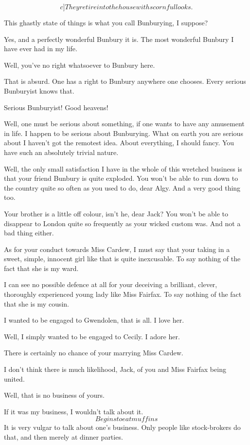 \documentclass{book}
\begin{document}
\[c]They retire into the house with scornful looks.\]

\1  This ghastly state of things is what you call Bunburying, I
suppose?

\2  Yes, and a perfectly wonderful Bunbury it is.  The most
wonderful Bunbury I have ever had in my life.

\1  Well, you've no right whatsoever to Bunbury here.

\2  That is absurd.  One has a right to Bunbury anywhere one
chooses.  Every serious Bunburyist knows that.

\1  Serious Bunburyist!  Good heavens!

\2  Well, one must be serious about something, if one wants
to have any amusement in life.  I happen to be serious about
Bunburying.  What on earth you are serious about I haven't got the
remotest idea.  About everything, I should fancy.  You have such an
absolutely trivial nature.

\1  Well, the only small satisfaction I have in the whole of
this wretched business is that your friend Bunbury is quite
exploded.  You won't be able to run down to the country quite so
often as you used to do, dear Algy.  And a very good thing too.

\2  Your brother is a little off colour, isn't he, dear
Jack?  You won't be able to disappear to London quite so frequently
as your wicked custom was.  And not a bad thing either.

\1  As for your conduct towards Miss Cardew, I must say that
your taking in a sweet, simple, innocent girl like that is quite
inexcusable.  To say nothing of the fact that she is my ward.

\2  I can see no possible defence at all for your deceiving
a brilliant, clever, thoroughly experienced young lady like Miss
Fairfax.  To say nothing of the fact that she is my cousin.

\1  I wanted to be engaged to Gwendolen, that is all.  I love
her.

\2  Well, I simply wanted to be engaged to Cecily.  I adore
her.

\1  There is certainly no chance of your marrying Miss Cardew.

\2  I don't think there is much likelihood, Jack, of you and
Miss Fairfax being united.

\1  Well, that is no business of yours.

\2  If it was my business, I wouldn't talk about it.
\[Begins to eat muffins\]  It is very vulgar to talk about one's
business.  Only people like stock-brokers do that, and then merely
at dinner parties.
\end{document}
